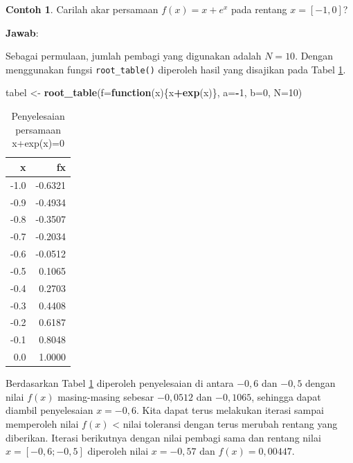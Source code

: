 \documentclass[
]{book}
\newenvironment{Shaded}{\begin{snugshade}}{\end{snugshade}}
\newcommand{\AttributeTok}[1]{\textcolor[rgb]{0.13,0.29,0.53}{#1}}
\newcommand{\ControlFlowTok}[1]{\textcolor[rgb]{0.13,0.29,0.53}{\textbf{#1}}}
\newcommand{\DecValTok}[1]{\textcolor[rgb]{0.00,0.00,0.81}{#1}}
\newcommand{\FunctionTok}[1]{\textcolor[rgb]{0.13,0.29,0.53}{\textbf{#1}}}
\newcommand{\NormalTok}[1]{#1}
\newcommand{\OtherTok}[1]{\textcolor[rgb]{0.56,0.35,0.01}{#1}}
\newcommand{\SpecialCharTok}[1]{\textcolor[rgb]{0.81,0.36,0.00}{\textbf{#1}}}
\theoremstyle{definition}
\theoremstyle{definition}
\newtheorem{example}{Contoh}[chapter]
\theoremstyle{definition}
\theoremstyle{definition}
\theoremstyle{remark}
\begin{document}
\begin{example}
\protect\hypertarget{exm:tabelexmp}{}\label{exm:tabelexmp}Carilah akar persamaan \(f\left(x \right)=x+e^{x}\) pada rentang \(x=\left[-1,0 \right]\)?
\end{example}

\textbf{Jawab}:

Sebagai permulaan, jumlah pembagi yang digunakan adalah \(N=10\). Dengan menggunakan fungsi \texttt{root\_table()} diperoleh hasil yang disajikan pada Tabel \ref{tab:tabeltabel}.

\begin{Shaded}
\begin{Highlighting}[]
\NormalTok{tabel }\OtherTok{\textless{}{-}} \FunctionTok{root\_table}\NormalTok{(}\AttributeTok{f=}\ControlFlowTok{function}\NormalTok{(x)\{x}\SpecialCharTok{+}\FunctionTok{exp}\NormalTok{(x)\},}
                     \AttributeTok{a=}\SpecialCharTok{{-}}\DecValTok{1}\NormalTok{, }\AttributeTok{b=}\DecValTok{0}\NormalTok{, }\AttributeTok{N=}\DecValTok{10}\NormalTok{)}
\end{Highlighting}
\end{Shaded}

\begin{table}

\caption{\label{tab:tabeltabel}Penyelesaian persamaan x+exp(x)=0}
\centering
\begin{tabular}[t]{r|r}
\hline
x & fx\\
\hline
-1.0 & -0.6321\\
\hline
-0.9 & -0.4934\\
\hline
-0.8 & -0.3507\\
\hline
-0.7 & -0.2034\\
\hline
-0.6 & -0.0512\\
\hline
-0.5 & 0.1065\\
\hline
-0.4 & 0.2703\\
\hline
-0.3 & 0.4408\\
\hline
-0.2 & 0.6187\\
\hline
-0.1 & 0.8048\\
\hline
0.0 & 1.0000\\
\hline
\end{tabular}
\end{table}

Berdasarkan Tabel \ref{tab:tabeltabel} diperoleh penyelesaian di antara \(-0,6\) dan \(-0,5\) dengan nilai \(f\left(x \right)\) masing-masing sebesar \(-0,0512\) dan \(-0,1065\), sehingga dapat diambil penyelesaian \(x=-0,6\). Kita dapat terus melakukan iterasi sampai memperoleh nilai \(f\left(x \right)\) \textless{} nilai toleransi dengan terus merubah rentang yang diberikan. Iterasi berikutnya dengan nilai pembagi sama dan rentang nilai \(x=\left[-0,6;-0,5\right]\) diperoleh nilai \(x=-0,57\) dan \(f\left(x \right)=0,00447\).
\end{document}
